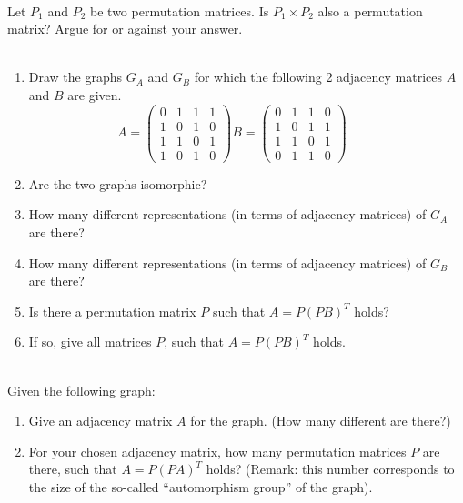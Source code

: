\documentclass[10pt]{article}
\begin{document}
\\
Let $P_1$ and $P_2$ be two permutation matrices. Is $P_1 \times P_2$ also a permutation matrix? Argue for or against your answer.\\

\\
\begin{enumerate}
\item Draw the graphs $G_A$ and $G_B$ for which the following 2 adjacency matrices $A$ and $B$ are given.
\begin{equation*}
A= \left(\begin{array}{ccccc}
           0 & 1 & 1 & 1  \\
           1 & 0 & 1 & 0  \\
           1 & 1 & 0 & 1  \\
           1 & 0 & 1 & 0  
\end{array}\right)
B= \left(\begin{array}{ccccc}
           0 & 1 & 1 & 0  \\
           1 & 0 & 1 & 1  \\
           1 & 1 & 0 & 1  \\
           0 & 1 & 1 & 0  
\end{array}\right)\hspace{1cm}
\end{equation*}
\item Are the two graphs isomorphic?
\item How many different representations (in terms of adjacency matrices) of $G_A$ are there?
\item How many different representations (in terms of adjacency matrices) of $G_B$ are there?
\item Is there a permutation matrix $P$ such that $A=P\left(PB\right)^T$ holds? 
\item If so, give all matrices $P$, such that  $A=P\left(PB\right)^T$ holds.
\end{enumerate}

\\[1cm]
Given the following graph:\\

\begin{enumerate}
\item Give an adjacency matrix $A$ for the graph. (How many different are there?)
\item For your chosen adjacency matrix, how many permutation matrices $P$ are there, such that
  $A=P\left(PA\right)^T$ holds? (Remark: this number corresponds to the size of the so-called ``automorphism group'' of the graph). 
\end{enumerate}
\newpage
\end{document}

